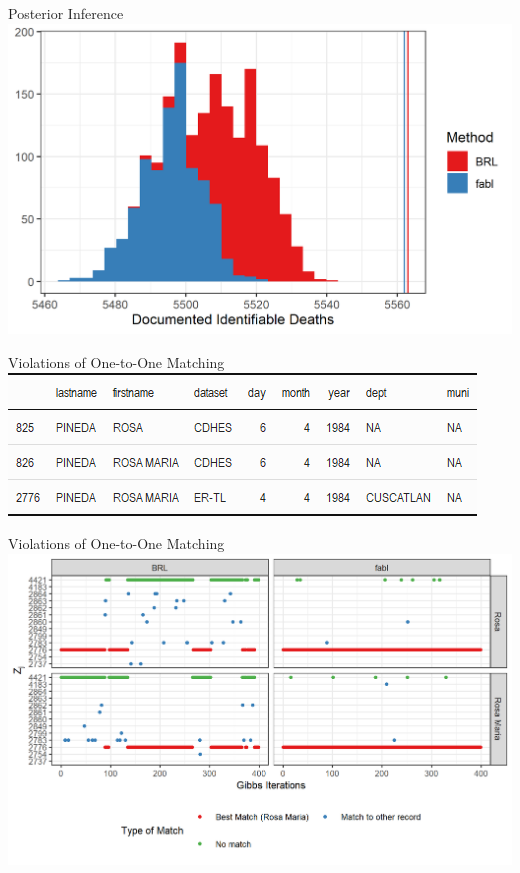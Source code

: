 \documentclass{beamer}
\begin{document}
\begin{frame}{Posterior Inference}
	\includegraphics[width = \textwidth, height = .6\textwidth ]{../notes/figures/el_salvador/DID_distribution_smallP_bayes.png}
\end{frame}

\begin{frame}{Violations of One-to-One Matching}
	\centering
	\includegraphics[width = .9\textwidth, height = .4\textwidth ]{../notes/figures/el_salvador/rosa_records.png}
\end{frame}

\begin{frame}{Violations of One-to-One Matching}
	\includegraphics[width = \textwidth, height = .6\textwidth ]{../notes/figures/el_salvador/bad_mixing.png}
\end{frame}
\end{document}
